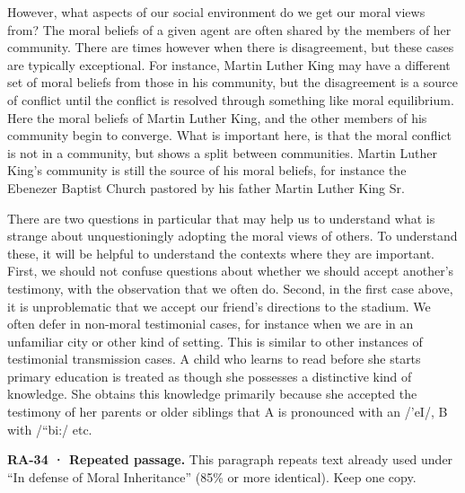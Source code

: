 \documentclass[
  letterpaper,
  DIV=11,
  numbers=noendperiod]{scrartcl}
\theoremstyle{remark}
\begin{document}
However, what aspects of our social environment do we get our moral
views from? The moral beliefs of a given agent are often shared by the
members of her community. There are times however when there is
disagreement, but these cases are typically exceptional. For instance,
Martin Luther King may have a different set of moral beliefs from those
in his community, but the disagreement is a source of conflict until the
conflict is resolved through something like moral equilibrium. Here the
moral beliefs of Martin Luther King, and the other members of his
community begin to converge. What is important here, is that the moral
conflict is not in a community, but shows a split between communities.
Martin Luther King's community is still the source of his moral beliefs,
for instance the Ebenezer Baptist Church pastored by his father Martin
Luther King Sr.

There are two questions in particular that may help us to understand
what is strange about unquestioningly adopting the moral views of
others. To understand these, it will be helpful to understand the
contexts where they are important. First, we should not confuse
questions about whether we should accept another's testimony, with the
observation that we often do. Second, in the first case above, it is
unproblematic that we accept our friend's directions to the stadium. We
often defer in non-moral testimonial cases, for instance when we are in
an unfamiliar city or other kind of setting. This is similar to other
instances of testimonial transmission cases. A child who learns to read
before she starts primary education is treated as though she possesses a
distinctive kind of knowledge. She obtains this knowledge primarily
because she accepted the testimony of her parents or older siblings that
A is pronounced with an /'eI/, B with /``bi:/ etc.

\begin{tcolorbox}[enhanced jigsaw, arc=.35mm, bottomrule=.15mm, bottomtitle=1mm, breakable, colback=white, colbacktitle=quarto-callout-important-color!10!white, colframe=quarto-callout-important-color-frame, coltitle=black, left=2mm, leftrule=.75mm, opacityback=0, opacitybacktitle=0.6, rightrule=.15mm, title=\textcolor{quarto-callout-important-color}{\faExclamation}\hspace{0.5em}{Important}, titlerule=0mm, toprule=.15mm, toptitle=1mm]

\textbf{RA-34 · Repeated passage.} This paragraph repeats text already
used under ``In defense of Moral Inheritance'' (85\% or more identical).
Keep one copy.

\end{tcolorbox}
\end{document}
